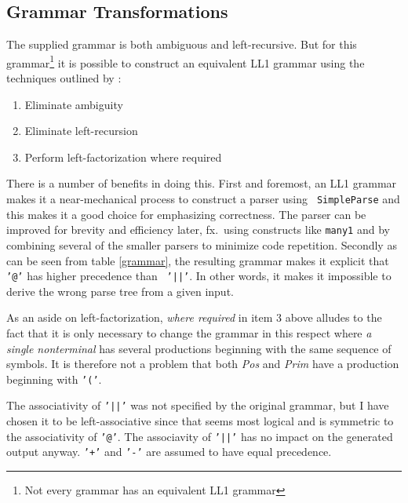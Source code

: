 \documentclass[
paper=a4,
oneside,
fontsize=11pt,
numbers=noenddot,
headinclude=false, %
footinclude=false, %
fleqn,             %
DIV=8
]{scrartcl}
\begin{document}
\subsection{Grammar Transformations}

The supplied grammar is both ambiguous and left-recursive. But for this
grammar\footnote{Not every grammar has an equivalent \acs{LL1} grammar} it is
possible to construct an equivalent \acs{LL1} grammar using the techniques
outlined by \citet[p.~69]{mogensen2011}:
\begin{enumerate}
\item Eliminate ambiguity
\item Eliminate left-recursion
\item Perform left-factorization where required
\end{enumerate}
There is a number of benefits in doing this. First and foremost, an \acs{LL1}
grammar makes it a near-mechanical process to construct a parser using {\tt
  SimpleParse} and this makes it a good choice for emphasizing correctness. The
parser can be improved for brevity and efficiency later, fx.\ using constructs
like {\tt many1} and by combining several of the smaller parsers to minimize
code repetition. Secondly as can be seen from table \ref{grammar}, the resulting
grammar makes it explicit that {\tt '@'} has higher precedence than {\tt
  '||'}. In other words, it makes it impossible to derive the wrong parse tree
from a given input.

As an aside on left-factorization, {\em where required} in item 3 above alludes
to the fact that it is only necessary to change the grammar in this respect
where {\em a single nonterminal} has several productions beginning with the same
sequence of symbols. It is therefore not a problem that both {\em Pos} and {\em
  Prim} have a production beginning with {\tt '('}.

The associativity of {\tt '||'} was not specified by the original grammar, but I
have chosen it to be left-associative since that seems most logical and is
symmetric to the associativity of {\tt '@'}. The associavity of {\tt '||'} has
no impact on the generated output anyway. {\tt '+'} and {\tt '-'} are assumed to
have equal precedence.
\end{document}
